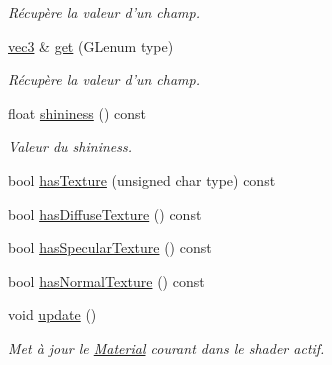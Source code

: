 \begin{DoxyCompactItemize}
\begin{DoxyCompactList}\small\item\em Récupère la valeur d'un champ. \end{DoxyCompactList}\item 
\hyperlink{structvec3}{vec3} \& \hyperlink{class_material_a229d118ec5602033bafbc1212a7b72ce}{get} (G\+Lenum type)
\begin{DoxyCompactList}\small\item\em Récupère la valeur d'un champ. \end{DoxyCompactList}\item 
float \hyperlink{class_material_a9a938aa96f0d5a5dc4d17d43cfd4b42b}{shininess} () const 
\begin{DoxyCompactList}\small\item\em Valeur du shininess. \end{DoxyCompactList}\item 
bool \hyperlink{class_material_a5a489f2fa09381b917c6bc3244e02877}{has\+Texture} (unsigned char type) const 
\item 
bool \hyperlink{class_material_aa07bc322b6904dd4ccf61620a0eb703c}{has\+Diffuse\+Texture} () const 
\item 
bool \hyperlink{class_material_ab1d0beef91e6149c0ebfc6c82b977889}{has\+Specular\+Texture} () const 
\item 
bool \hyperlink{class_material_a9bfe6c055d9af6f3ef029b62cc57e6a1}{has\+Normal\+Texture} () const 
\item 
void \hyperlink{class_material_a3f43fe7bcfa721fd8156adb151adf45c}{update} ()
\begin{DoxyCompactList}\small\item\em Met à jour le \hyperlink{class_material}{Material} courant dans le shader actif. \end{DoxyCompactList}\end{DoxyCompactItemize}
